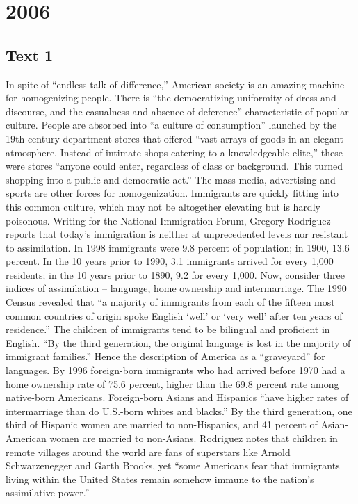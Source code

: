 
\section{2006}
\subsection{Text 1}
In spite of “endless talk of difference,” American society is an amazing machine for homogenizing people. There is “the democratizing uniformity of dress and discourse, and the casualness and absence of deference” characteristic of popular culture. People are absorbed into “a culture of consumption” launched by the 19th-century department stores that offered “vast arrays of goods in an elegant atmosphere. Instead of intimate shops catering to a knowledgeable elite,” these were stores “anyone could enter, regardless of class or background. This turned shopping into a public and democratic act.” The mass media, advertising and sports are other forces for homogenization.
Immigrants are quickly fitting into this common culture, which may not be altogether elevating but is hardly poisonous. Writing for the National Immigration Forum, Gregory Rodriguez reports that today’s immigration is neither at unprecedented levels nor resistant to assimilation. In 1998 immigrants were 9.8 percent of population; in 1900, 13.6 percent. In the 10 years prior to 1990, 3.1 immigrants arrived for every 1,000 residents; in the 10 years prior to 1890, 9.2 for every 1,000. Now, consider three indices of assimilation -- language, home ownership and intermarriage.
The 1990 Census revealed that “a majority of immigrants from each of the fifteen most common countries of origin spoke English ‘well’ or ‘very well’ after ten years of residence.” The children of immigrants tend to be bilingual and proficient in English. “By the third generation, the original language is lost in the majority of immigrant families.” Hence the description of America as a “graveyard” for languages. By 1996 foreign-born immigrants who had arrived before 1970 had a home ownership rate of 75.6 percent, higher than the  69.8 percent rate among native-born Americans.
Foreign-born Asians and Hispanics “have higher rates of intermarriage than do U.S.-born whites and blacks.” By the third generation, one third of Hispanic women are married to non-Hispanics, and 41 percent of Asian-American women are married to non-Asians.
Rodriguez notes that children in remote villages around the world are fans of superstars like Arnold Schwarzenegger and Garth Brooks, yet “some Americans fear that immigrants living within the United States remain somehow immune to the nation’s assimilative power.”
